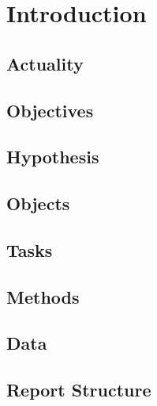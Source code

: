 \chapter*{Introduction}

\section*{Actuality}


\section*{Objectives}


\section*{Hypothesis}


\section*{Objects}


\section*{Tasks}


\section*{Methods}


\section*{Data}



\section*{Report Structure}


